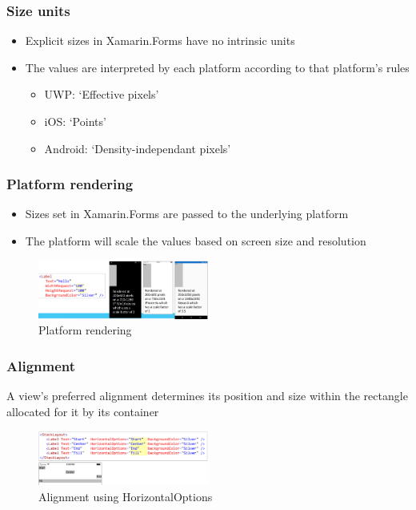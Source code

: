 \documentclass{article}
\begin{document}
\subsubsection{Size units}

\begin{itemize}
    \item Explicit sizes in Xamarin.Forms have no intrinsic units
    \item The values are interpreted by each platform according to that platform's rules
    \begin{itemize}
        \item UWP: `Effective pixels'
        \item iOS: `Points'
        \item Android: `Density-independant pixels'
    \end{itemize}
\end{itemize}

\subsubsection{Platform rendering}
\begin{itemize}
    \item Sizes set in Xamarin.Forms are passed to the underlying platform
    \item The platform will scale the values based on screen size and resolution
\end{itemize}


\begin{figure}[H]
    \centering
    \includegraphics[width=0.5\textwidth]{xaml-platform-rendering.png}
    \caption{Platform rendering}
\end{figure}

\subsubsection{Alignment}

A view's preferred alignment determines its position and size within the rectangle allocated for it by its container

\begin{figure}[H]
    \centering
    \includegraphics[width=0.5\textwidth]{xaml-alingment.png}
    \caption{Alignment using HorizontalOptions}
\end{figure}
\end{document}
